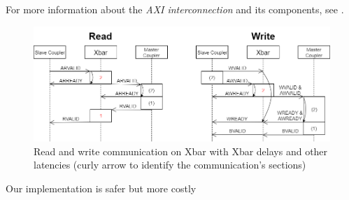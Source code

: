 For more information about the \textit{AXI interconnection} and its components, see \cite{AXIInterconnectGuide}.
\newline

\begin{figure}[!hb]
  \includegraphics[width=\textwidth]{./../../img/Images/Read_Write_xbar}
  \caption{Read and write communication on Xbar with {\color{Red}Xbar delays} and other latencies (curly arrow to identify the communication's sections)}
  \label{RWXbar}
\end{figure}



{}
Our implementation is safer but more costly
